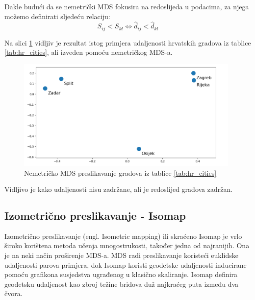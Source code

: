 \documentclass[times, utf8, diplomski]{fer}
\begin{document}
Dakle budući da se nemetrički MDS fokusira na redoslijeda u podacima, za njega možemo definirati sljedeću relaciju:
\begin{equation}
    S_{ij} < S_{kl} \iff \hat{d}_{ij} < \hat{d}_{kl}
\end{equation}

Na slici \ref{fig:mds_mapping_hr_nonmetrc} vidljiv je rezultat istog primjera udaljenosti hrvatskih gradova iz tablice \ref{tab:hr_cities}, ali izveden pomoću nemetričkog MDS-a.

\begin{figure}[htb]
    \centering
    \includegraphics[width=11cm]{resources/images/reduction/mds_mapping_hr_nonmetric.png}
    \caption{Nemetričko MDS preslikavanje gradova iz tablice \ref{tab:hr_cities}}
    \label{fig:mds_mapping_hr_nonmetrc}
\end{figure}
Vidljivo je kako udaljenosti nisu zadržane, ali je redoslijed gradova zadržan.

\subsection{Izometrično preslikavanje - Isomap}

Izometrično preslikavanje (engl. Isometric mapping) ili skraćeno Isomap je vrlo široko korištena metoda učenja mnogostrukosti, također jedna od najranijih. Ona je na neki način proširenje MDS-a. MDS radi preslikavanje koristeći euklidske udaljenosti parova primjera, dok Isomap koristi geodetske udaljenosti inducirane pomoću grafikona susjedstva ugrađenog u klasično skaliranje. Isomap definira geodetsku udaljenost kao zbroj težine bridova duž najkraćeg puta između dva čvora.
\end{document}

